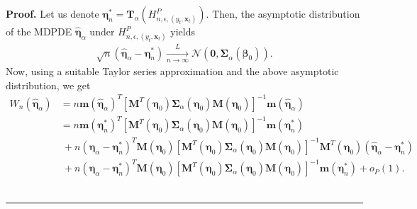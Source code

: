 \documentclass[a4paper]{article}%
\newenvironment{proof}[1][Proof]{\noindent \textbf{#1.} }{\  \rule{0.5em}{0.5em}}
\begin{document}
\begin{proof}
Let us denote $\boldsymbol{\eta}_{n}^{\ast}=\boldsymbol{T}_{\alpha
}(H_{n,\epsilon,(y_{t},\boldsymbol{x}_{t})}^{P})$. Then, the asymptotic
distribution of the MDPDE $\widehat{\boldsymbol{\eta}}_{\alpha}$ under
$H_{n,\epsilon,(y_{t},\boldsymbol{x}_{t})}^{P}$ yields
\begin{align}
\sqrt{n}\left(  \widehat{\boldsymbol{\eta}}_{\alpha}-\boldsymbol{\eta}%
_{n}^{\ast}\right)  \underset{n\rightarrow\infty}{\overset{L}{\longrightarrow
}}\mathcal{N}\left(  \boldsymbol{0,\Sigma}_{\alpha}\left(  \boldsymbol{\beta
}_{0}\right)  \right) .\label{eq1}%
\end{align}
Now, using a suitable Taylor series approximation and the above asymptotic
distribution, we get
\begin{align}
W_{n}\left(  \widehat{\boldsymbol{\eta}}_{\alpha}\right)   &  =n\boldsymbol{m}%
\left(  \widehat{\boldsymbol{\eta}}_{\alpha}\right)  ^{T}\left[
\boldsymbol{M}^{T}\left(  \boldsymbol{\eta}_{0}\right)  \boldsymbol{\Sigma
}_{\alpha}\left(  \boldsymbol{\eta}_{0}\right)  \boldsymbol{M}\left(
\boldsymbol{\eta}_{0}\right)  \right]  ^{-1}\boldsymbol{m}\left(
\widehat{\boldsymbol{\eta}}_{\alpha}\right) \nonumber\\
&  =n\boldsymbol{m}\left(  \boldsymbol{\eta}_{n}^{\ast}\right)  ^{T}\left[
\boldsymbol{M}^{T}\left(  \boldsymbol{\eta}_{0}\right)  \boldsymbol{\Sigma
}_{\alpha}\left(  \boldsymbol{\eta}_{0}\right)  \boldsymbol{M}\left(
\boldsymbol{\eta}_{0}\right)  \right]  ^{-1}\boldsymbol{m}\left(
\boldsymbol{\eta}_{n}^{\ast}\right) \nonumber\\
&  ~+n\left(  \widehat{\boldsymbol{\eta}}_{\alpha}-\boldsymbol{\eta}_{n}%
^{\ast}\right)  ^{T}\boldsymbol{M}\left(  \boldsymbol{\eta}_{0}\right)
\left[  \boldsymbol{M}^{T}\left(  \boldsymbol{\eta}_{0}\right)
\boldsymbol{\Sigma}_{\alpha}\left(  \boldsymbol{\eta}_{0}\right)
\boldsymbol{M}\left(  \boldsymbol{\eta}_{0}\right)  \right]  ^{-1}%
\boldsymbol{M}^{T}\left(  \boldsymbol{\eta}_{0}\right) \left(
\widehat{\boldsymbol{\eta}}_{\alpha}-\boldsymbol{\eta}_{n}^{\ast}\right)
\nonumber\\
&  ~+n\left(  \widehat{\boldsymbol{\eta}}_{\alpha}-\boldsymbol{\eta}_{n}%
^{\ast}\right)  ^{T}\boldsymbol{M}\left(  \boldsymbol{\eta}_{0}\right)
\left[  \boldsymbol{M}^{T}\left(  \boldsymbol{\eta}_{0}\right)
\boldsymbol{\Sigma}_{\alpha}\left(  \boldsymbol{\eta}_{0}\right)
\boldsymbol{M}\left(  \boldsymbol{\eta}_{0}\right)  \right]  ^{-1}%
\boldsymbol{m}\left(  \boldsymbol{\eta}_{n}^{\ast}\right)  +o_{P}(1).\nonumber

\end{align}
\end{proof}
\end{document}
